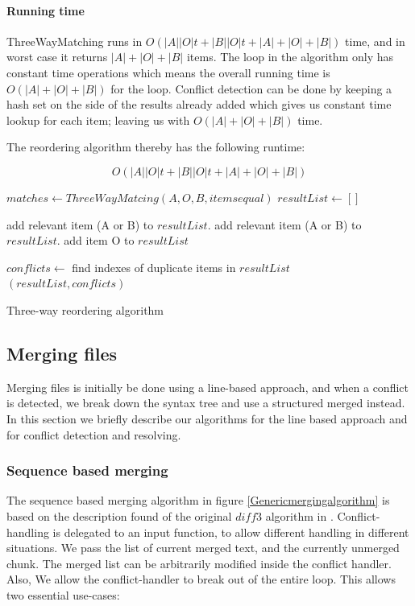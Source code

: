 \documentclass[11pt]{article}
\begin{document}
\paragraph{Running time} ThreeWayMatching runs in $O(|A||O| t + |B||O| t + |A|+|O|+|B| )$ time, and in worst case it returns $|A|+|O|+|B|$ items. The loop in the algorithm only has constant time operations which means the overall running time is $O(|A|+|O|+|B|)$ for the loop. Conflict detection can be done by keeping a hash set on the side of the results already added which gives us constant time lookup for each item; leaving us with $O(|A|+|O|+|B|)$ time.

The reordering algorithm thereby has the following runtime:

\begin{equation}
O(|A||O| t + |B||O| t + |A|+|O|+|B| ) \nonumber
\end{equation}

\begin{algorithm}
\begin{algorithmic}
   \State $matches \gets ThreeWayMatcing(A, O, B, items equal)$
   \State $resultList \gets []$
   
         \State add relevant item (A or B) to $resultList$.
      \EndIf
         \State add relevant item (A or B) to $resultList$.
      \EndIf
         \State add item O to $resultList$
      \EndIf
      
	\EndFor
	\State $conflicts \gets$ find indexes of duplicate items in $resultList$
	\State \Return $(resultList, conflicts)$
\EndFunction
\end{algorithmic}
\caption{Three-way reordering algorithm}
  \label{ThreeWayReorderingAlgorithm}
\end{algorithm}

\subsection{Merging files}
Merging files is initially be done using a line-based approach, and when a conflict is detected, we break down the syntax tree and use a structured merged instead. In this section we briefly describe our algorithms for the line based approach and for conflict detection and resolving.

\subsubsection{Sequence based merging}
The sequence based merging algorithm in figure \ref{Genericmergingalgorithm} is based on the description found of the original $diff3$ algorithm in \citet{Khanna}. Conflict-handling is delegated to an input function, to allow different handling in different situations. We pass the list of current merged text, and the currently unmerged chunk. The merged list can be arbitrarily modified inside the conflict handler. Also, We allow the conflict-handler to break out of the entire loop. This allows two essential use-cases:
\end{document}
